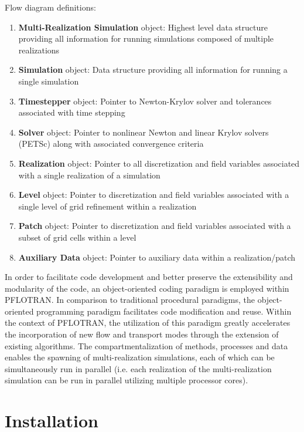 \documentclass[12pt]{article}
\begin{document}
Flow diagram definitions:
\begin{enumerate}
\item {\bf Multi-Realization Simulation} object: Highest level data structure providing all information for running simulations composed of multiple realizations
\item {\bf Simulation} object: Data structure providing all information for running a single simulation
\item {\bf Timestepper} object: Pointer to Newton-Krylov solver and tolerances associated with time stepping
\item {\bf Solver} object: Pointer to nonlinear Newton and linear Krylov solvers (PETSc) along with associated convergence criteria
\item {\bf Realization} object: Pointer to all discretization and field variables associated with a single realization of a simulation
\item {\bf Level} object: Pointer to discretization and field variables associated with a single level of grid refinement within a realization
\item {\bf Patch} object: Pointer to discretization and field variables associated with a subset of grid cells within a level
\item {\bf Auxiliary Data} object: Pointer to auxiliary data within a realization/patch
\end{enumerate}


In order to facilitate code development and better preserve the extensibility and modularity of the code, an object-oriented coding paradigm is employed within PFLOTRAN.  In comparison to traditional procedural paradigms, the object-oriented programming paradigm facilitates code modification and reuse.  Within the context of PFLOTRAN, the utilization of this paradigm greatly accelerates the incorporation of new flow and transport modes through the extension of existing algorithms.  The compartmentalization of methods, processes and data enables the spawning of multi-realization simulations, each of which can be simultaneously run in parallel (i.e. each realization of the multi-realization simulation can be run in parallel utilizing multiple processor cores).

\section{Installation}
\end{document}
